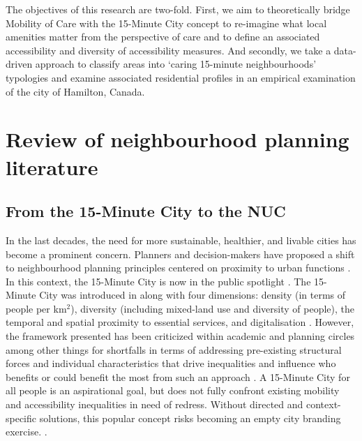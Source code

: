 \documentclass[
  authoryear,
  preprint,
  3p]{elsarticle}
\begin{document}
The objectives of this research are two-fold. First, we aim to
theoretically bridge Mobility of Care with the 15-Minute City concept to
re-imagine what local amenities matter from the perspective of care and
to define an associated accessibility and diversity of accessibility
measures. And secondly, we take a data-driven approach to classify areas
into `caring 15-minute neighbourhoods' typologies and examine associated
residential profiles in an empirical examination of the city of
Hamilton, Canada.

\section{Review of neighbourhood planning
literature}\label{review-of-neighbourhood-planning-literature}

\subsection{From the 15-Minute City to the
NUC}\label{from-the-15-minute-city-to-the-nuc}

In the last decades, the need for more sustainable, healthier, and
livable cities has become a prominent concern. Planners and
decision-makers have proposed a shift to neighbourhood planning
principles centered on proximity to urban functions
\citep{pozoukidou15MinuteCityDecomposing2021}. In this context, the
15-Minute City is now in the public spotlight
\citep{logan_xminute_2022, moreno_introducing_2021}. The 15-Minute City
was introduced in \citet{moreno_introducing_2021} along with four
dimensions: density (in terms of people per km\(^2\)), diversity
(including mixed-land use and diversity of people), the temporal and
spatial proximity to essential services, and digitalisation
\citep[related concepts in][]{cerveroTravelDemand3Ds1997}. However, the
framework presented has been criticized within academic and planning
circles
\citep[e.g.,][]{guzmanProximityEnoughCritical2024, mouratidisTimeChallenge15minute2024}
among other things for shortfalls in terms of addressing pre-existing
structural forces and individual characteristics that drive inequalities
and influence who benefits or could benefit the most from such an
approach
\citep{dimarino15minuteCityConcept2023, willberg15minuteCityAll2023}. A
15-Minute City for all people is an aspirational goal, but does not
fully confront existing mobility and accessibility inequalities in need
of redress. Without directed and context-specific solutions, this
popular concept risks becoming an empty city branding exercise.
\citep{pozoukidou15MinuteCityDecomposing2021, gowerPlanningInnovationCity2022}.
\end{document}
